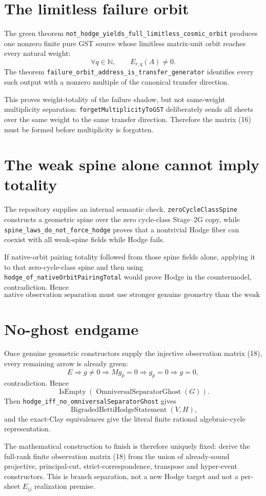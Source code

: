 \documentclass[11pt]{article}
\begin{document}
\section{The limitless failure orbit}

The green theorem
\texttt{not\_hodge\_yields\_full\_limitless\_cosmic\_orbit} produces one
nonzero finite pure GST source whose limitless matrix-unit orbit reaches every
natural weight:
\[
 \forall q\in\mathbb N,\qquad E_{r,q}(A)\neq0. \tag{19}
\]
The theorem \texttt{failure\_orbit\_address\_is\_transfer\_generator}
identifies every such output with a nonzero multiple of the canonical transfer
direction.

This proves weight-totality of the failure shadow, but not same-weight
multiplicity separation: \texttt{forgetMultiplicityToGST} deliberately sends
all sheets over the same weight to the same transfer direction. Therefore the
matrix (16) must be formed before multiplicity is forgotten.

\section{The weak spine alone cannot imply totality}

The repository supplies an internal semantic check.
\texttt{zeroCycleClassSpine} constructs a geometric spine over the zero
cycle-class Stage--2G copy, while
\texttt{spine\_laws\_do\_not\_force\_hodge} proves that a nontrivial Hodge
fiber can coexist with all weak-spine fields while Hodge fails.

If native-orbit pairing totality followed from those spine fields alone,
applying it to that zero-cycle-class spine and then using
\texttt{hodge\_of\_nativeOrbitPairingTotal} would prove Hodge in the
countermodel, contradiction. Hence
\[
 \boxed{\text{native observation separation must use stronger genuine
 geometry than the weak spine fields alone.}} \tag{20}
\]

\section{No-ghost endgame}

Once genuine geometric constructors supply the injective observation matrix
(18), every remaining arrow is already green:
\[
E\Longrightarrow g\neq0
\Longrightarrow M g_p=0
\Longrightarrow g_p=0
\Longrightarrow g=0,
\]
contradiction. Hence
\[
 \operatorname{IsEmpty}(\operatorname{OmniversalSeparatorGhost}(G)).
\]
Then \texttt{hodge\_iff\_no\_omniversalSeparatorGhost} gives
\[
 \operatorname{BigradedBettiHodgeStatement}(V,H),
\]
and the exact-Clay equivalences give the literal finite rational algebraic-cycle
representation.

The mathematical construction to finish is therefore uniquely fixed: derive
the full-rank finite observation matrix (18) from the union of already-sound
projective, principal-cut, strict-correspondence, transpose and hyper-event
constructors. This is branch separation, not a new Hodge target and not a
per-sheet $E_{ij}$ realization premise.
\end{document}

